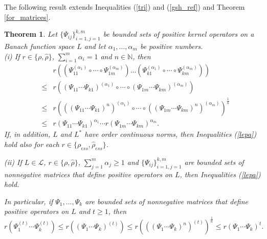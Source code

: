 \documentclass[12pt, reqno]{amsart}
\newtheorem{theorem}{Theorem}[section]
\theoremstyle{definition}
\theoremstyle{remark}
\numberwithin{equation}{section}
\newcommand{\be}{\begin{equation}}
\newcommand{\ee}{\end{equation}}
\newcommand{\NN}{\mathbb{N}}
\begin{document}
The following result extends Inequalities (\ref{tri}) and (\ref{gsh_ref}) and Theorem \ref{for_matrices}.
%
\begin{theorem}
\label{finally}
Let $\{\Psi _{i j}\}_{i=1, j=1}^{k, m}$ be bounded sets of positive kernel operators on a Banach function space $L$ and let
 $\alpha _1, \ldots , \alpha _m$ be positive numbers.   \\

\noindent (i) If  $r \in \{\rho, \hat{\rho}\}$, $\sum _{i=1} ^m \alpha _i = 1$ and $n \in \NN$, then
%
\begin{eqnarray}
\nonumber
& & r \left(\left(\Psi_{1 1}^{(\alpha _1)} \circ \cdots \circ \Psi_{1 m}^{(\alpha _m)}\right) \ldots \left(\Psi_{k 1}^{(\alpha _1)} \circ \cdots \circ \Psi_{k m}^{(\alpha _m)} \right) \right) \\
\nonumber
& \le &r \left((\Psi_{1 1} \cdots  \Psi_{k 1})^{(\alpha _1)} \circ \cdots
\circ (\Psi_{1 m} \cdots \Psi_{k m})^{(\alpha _m)}\right)\\
\nonumber
& \le &r \left(((\Psi_{1 1} \cdots  \Psi_{k 1})^n)^{(\alpha _1)} \circ \cdots
\circ ((\Psi_{1 m} \cdots \Psi_{k m})^n)^{(\alpha _m)}\right)^{\frac{1}{n}}\\
&\le&r \left( \Psi_{1 1} \cdots  \Psi_{k 1} \right)^{\alpha _1} \cdots
r \left( \Psi_{1 m} \cdots \Psi_{k m}\right)^{\alpha _m} .
\label{lepa}
\end{eqnarray}
If, in addition, $L$ and $L^*$ have order continuous norms, then Inequalities (\ref{lepa}) hold also for each $r\in \{ \rho _{ess}, \hat{\rho} _{ess}\}$.

\noindent(ii) If $L\in\mathcal L$, $r \in \{\rho, \hat{\rho}\}$, $\sum_{j=1}^{m} \alpha _j\ge 1$ and $\{\Psi_{i j}\}_{i=1, j=1}^{k, m}$ are bounded sets of nonnegative matrices that define positive operators on $L$, then Inequalities (\ref{lepa}) hold. 

In particular, if $\Psi _1, \ldots, \Psi_k$ are bounded sets of nonnegative matrices that define positive operators on $L$ and
 $t\ge1$, then
\be
r (\Psi _1 ^{(t)} \cdots \Psi _k ^{(t)})\le r ((\Psi _1 \cdots \Psi _k) ^{(t)}) \le r(((\Psi _1 \cdots \Psi _k)^n)^{(t)})^{\frac{1}{n}}\le r(\Psi _1 \cdots \Psi _k)^{t}.
\label{with_t}
\ee 
\end{theorem}
\end{document}
